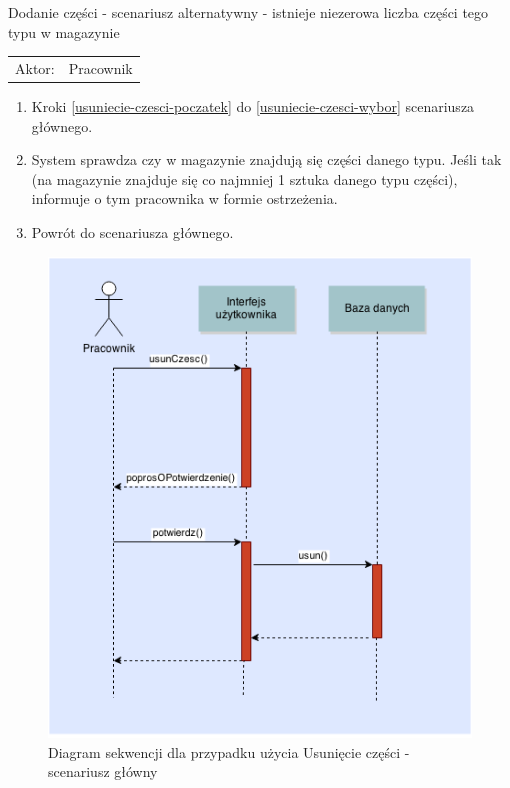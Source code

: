   \item Dodanie części - scenariusz alternatywny - istnieje niezerowa liczba części tego typu w magazynie \\
  \begin{tabularx}{\linewidth}{ c X}
  Aktor: & Pracownik \\
  \end{tabularx}
   \begin{enumerate}
    \item Kroki \ref{usuniecie-czesci-poczatek} do \ref{usuniecie-czesci-wybor} scenariusza głównego.
    \item System sprawdza czy w magazynie znajdują się części danego typu. Jeśli tak (na magazynie znajduje się co najmniej 1 sztuka danego typu części), informuje o tym pracownika w formie ostrzeżenia.
    \item Powrót do scenariusza głównego.
  \end{enumerate}
  	
\begin{figure}[h!]
    \includegraphics[width=\textwidth,
    height=0.7\textheight]{graphics/UseCase/Czesci/UsuniecieCzesciSD.png}
  \caption{Diagram sekwencji dla przypadku użycia Usunięcie części - scenariusz główny}
\end{figure}